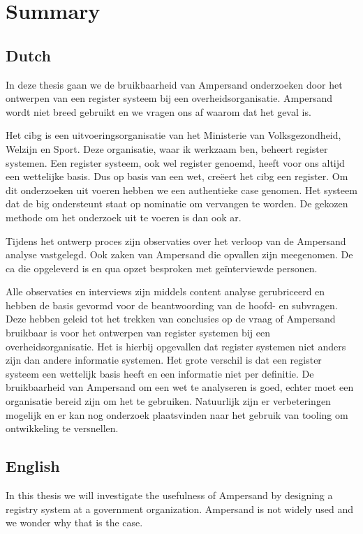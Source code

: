 \newpage
\section{Summary} \label{Summary}

\subsection{Dutch}
In deze thesis gaan we de bruikbaarheid van Ampersand onderzoeken door het ontwerpen van een register systeem bij een overheidsorganisatie.
Ampersand wordt niet breed gebruikt en we vragen ons af waarom dat het geval is.

Het \acrshort{cibg} is een uitvoeringsorganisatie van het Ministerie van Volksgezondheid, Welzijn en Sport. 
Deze organisatie, waar ik werkzaam ben, beheert register systemen.
Een register systeem, ook wel register genoemd, heeft voor ons altijd een wettelijke basis. 
Dus op basis van een wet, creëert het \acrshort{cibg} een register.
Om dit onderzoeken uit voeren hebben we een authentieke case genomen.
Het systeem dat de \acrshort{big} ondersteunt staat op nominatie om vervangen te worden.
De gekozen methode om het onderzoek uit te voeren is dan ook \acrshort{ar}.

Tijdens het ontwerp proces zijn observaties over het verloop van de Ampersand analyse vastgelegd. 
Ook zaken van Ampersand die opvallen zijn meegenomen.
De \acrlong{ca} die opgeleverd is en qua opzet besproken met geïnterviewde personen.

Alle observaties en interviews zijn middels content analyse gerubriceerd en hebben de basis gevormd voor de beantwoording van de hoofd- en subvragen. 
Deze hebben geleid tot het trekken van conclusies op de vraag of Ampersand bruikbaar is voor het ontwerpen van register systemen bij een overheidsorganisatie.
Het is hierbij opgevallen dat register systemen niet anders zijn dan andere informatie systemen.
Het grote verschil is dat een register systeem een wettelijk basis heeft en een informatie niet per definitie.
De bruikbaarheid van Ampersand om een wet te analyseren is goed, echter moet een organisatie bereid zijn om het te gebruiken. 
Natuurlijk zijn er verbeteringen mogelijk en er kan nog onderzoek plaatsvinden naar het gebruik van tooling om ontwikkeling te versnellen. 


\newpage
\subsection{English}
In this thesis we will investigate the usefulness of Ampersand by designing a registry system at a government organization.
Ampersand is not widely used and we wonder why that is the case.

